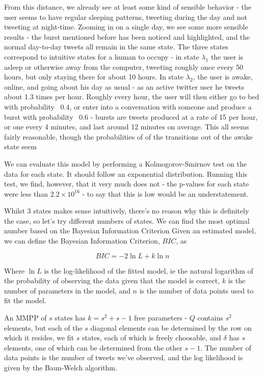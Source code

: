 
From this distance, we already see at least some kind of sensible behavior - the user seems to have regular sleeping patterns, tweeting during the day and not tweeting at night-time. Zooming in on a single day, we see some more sensible results - the burst mentioned before has been noticed and highlighted, and the normal day-to-day tweets all remain in the same state. The three states correspond to intuitive states for a human to occupy - in state $\lambda_1$ the user is asleep or otherwise away from the computer, tweeting roughly once every 50 hours, but only staying there for about 10 hours. In state $\lambda_2$, the user is awake, online, and going about his day as usual - as an active twitter user he tweets about 1.3 times per hour. Roughly every hour, the user will then either go to bed with probability ~$0.4$, or enter into a conversation with someone and produce a burst with probability ~$0.6$ - bursts are tweets produced at a rate of 15 per hour, or one every 4 minutes, and last around 12 minutes on average. This all seems fairly reasonable, though the probabilities of of the transitions out of the awake state seem

We can evaluate this model by performing a Kolmogorov-Smirnov test on the data for each state. It should follow an exponential distribution. Running this test, we find, however, that it very much does not - the p-values for each state were less than $2.2 \times 10^{16}$ - to say that this is low would be an understatement.

Whilst 3 states makes sense intuitively, there's no reason why this is definitely the case, so let's try different numbers of states. We can find the most optimal number based on the Bayesian Information Criterion %
Given an estimated model, we can define the Bayesian Information Criterion, $BIC$, as

$$
BIC = -2 \ln L + k \ln n
$$

Where $\ln L$ is the log-likelihood of the fitted model, ie the natural logarithm of the probability of observing the data given that the model is correct, $k$ is the number of parameters in the model, and $n$ is the number of data points used to fit the model.

An MMPP of $s$ states has $k=s^2+s-1$ free parameters - $Q$ contains $s^2$ elements, but each of the $s$ diagonal elements can be determined by the row on which it resides, we fit $s$ states, each of which is freely choosable, and $\delta$ has $s$ elements, one of which can be determined from the other $s-1$. The number of data points is the number of tweets we've observed, and the log likelihood is given by the Baun-Welch algorithm.

